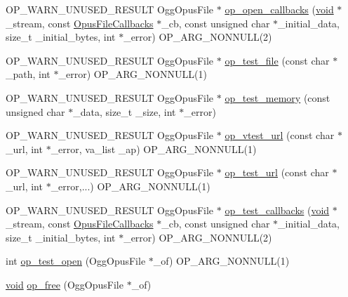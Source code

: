 \begin{DoxyCompactItemize}
O\+P\+\_\+\+W\+A\+R\+N\+\_\+\+U\+N\+U\+S\+E\+D\+\_\+\+R\+E\+S\+U\+LT Ogg\+Opus\+File $\ast$ \mbox{\hyperlink{group__stream__open__close_gad183ecf5fbec5add3a5ccf1e3b1d2593}{op\+\_\+open\+\_\+callbacks}} (\mbox{\hyperlink{_s_d_l__opengles2__gl2ext_8h_ae5d8fa23ad07c48bb609509eae494c95}{void}} $\ast$\+\_\+stream, const \mbox{\hyperlink{struct_opus_file_callbacks}{Opus\+File\+Callbacks}} $\ast$\+\_\+cb, const unsigned char $\ast$\+\_\+initial\+\_\+data, size\+\_\+t \+\_\+initial\+\_\+bytes, int $\ast$\+\_\+error) O\+P\+\_\+\+A\+R\+G\+\_\+\+N\+O\+N\+N\+U\+LL(2)
\item 
O\+P\+\_\+\+W\+A\+R\+N\+\_\+\+U\+N\+U\+S\+E\+D\+\_\+\+R\+E\+S\+U\+LT Ogg\+Opus\+File $\ast$ \mbox{\hyperlink{group__stream__open__close_ga3b12533b35cd3ac0d273c1e0efa35b6f}{op\+\_\+test\+\_\+file}} (const char $\ast$\+\_\+path, int $\ast$\+\_\+error) O\+P\+\_\+\+A\+R\+G\+\_\+\+N\+O\+N\+N\+U\+LL(1)
\item 
O\+P\+\_\+\+W\+A\+R\+N\+\_\+\+U\+N\+U\+S\+E\+D\+\_\+\+R\+E\+S\+U\+LT Ogg\+Opus\+File $\ast$ \mbox{\hyperlink{group__stream__open__close_gae093e19e16871f4cb53532fe1f0c1039}{op\+\_\+test\+\_\+memory}} (const unsigned char $\ast$\+\_\+data, size\+\_\+t \+\_\+size, int $\ast$\+\_\+error)
\item 
O\+P\+\_\+\+W\+A\+R\+N\+\_\+\+U\+N\+U\+S\+E\+D\+\_\+\+R\+E\+S\+U\+LT Ogg\+Opus\+File $\ast$ \mbox{\hyperlink{group__stream__open__close_ga93b438960ec52e13e7c77446f754d016}{op\+\_\+vtest\+\_\+url}} (const char $\ast$\+\_\+url, int $\ast$\+\_\+error, va\+\_\+list \+\_\+ap) O\+P\+\_\+\+A\+R\+G\+\_\+\+N\+O\+N\+N\+U\+LL(1)
\item 
O\+P\+\_\+\+W\+A\+R\+N\+\_\+\+U\+N\+U\+S\+E\+D\+\_\+\+R\+E\+S\+U\+LT Ogg\+Opus\+File $\ast$ \mbox{\hyperlink{group__stream__open__close_ga8272aa50f50ac63b20333f0a114bb247}{op\+\_\+test\+\_\+url}} (const char $\ast$\+\_\+url, int $\ast$\+\_\+error,...) O\+P\+\_\+\+A\+R\+G\+\_\+\+N\+O\+N\+N\+U\+LL(1)
\item 
O\+P\+\_\+\+W\+A\+R\+N\+\_\+\+U\+N\+U\+S\+E\+D\+\_\+\+R\+E\+S\+U\+LT Ogg\+Opus\+File $\ast$ \mbox{\hyperlink{group__stream__open__close_ga242081c67e45417e01b82e37fc4e24ea}{op\+\_\+test\+\_\+callbacks}} (\mbox{\hyperlink{_s_d_l__opengles2__gl2ext_8h_ae5d8fa23ad07c48bb609509eae494c95}{void}} $\ast$\+\_\+stream, const \mbox{\hyperlink{struct_opus_file_callbacks}{Opus\+File\+Callbacks}} $\ast$\+\_\+cb, const unsigned char $\ast$\+\_\+initial\+\_\+data, size\+\_\+t \+\_\+initial\+\_\+bytes, int $\ast$\+\_\+error) O\+P\+\_\+\+A\+R\+G\+\_\+\+N\+O\+N\+N\+U\+LL(2)
\item 
int \mbox{\hyperlink{group__stream__open__close_ga7b7f1c778ce6ced5538ce66e292d894d}{op\+\_\+test\+\_\+open}} (Ogg\+Opus\+File $\ast$\+\_\+of) O\+P\+\_\+\+A\+R\+G\+\_\+\+N\+O\+N\+N\+U\+LL(1)
\item 
\mbox{\hyperlink{_s_d_l__opengles2__gl2ext_8h_ae5d8fa23ad07c48bb609509eae494c95}{void}} \mbox{\hyperlink{group__stream__open__close_gaf494ef9aa761647d8167c49507560d1c}{op\+\_\+free}} (Ogg\+Opus\+File $\ast$\+\_\+of)
\end{DoxyCompactItemize}


